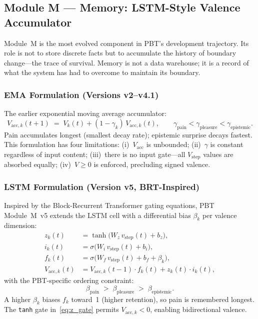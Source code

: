 \documentclass[12pt,a4paper]{article}
\begin{document}
\subsection{Module M --- Memory: LSTM-Style Valence Accumulator}

Module~M is the most evolved component in PBT's development trajectory. Its
role is not to store discrete facts but to accumulate the history of boundary
change---the trace of survival. Memory is not a data warehouse; it is a record
of what the system has had to overcome to maintain its boundary.

\subsubsection{EMA Formulation (Versions v2--v4.1)}

The earlier exponential moving average accumulator:
\begin{equation}
  V_{\mathrm{acc},k}(t{+}1) \;=\; V_k(t) + (1-\gamma_k)\,V_{\mathrm{acc},k}(t),
  \qquad \gamma_{\mathrm{pain}} < \gamma_{\mathrm{pleasure}} < \gamma_{\mathrm{epistemic}}.
  \label{eq:EMA}
\end{equation}
Pain accumulates longest (smallest decay rate); epistemic surprise decays
fastest. This formulation has four limitations: (i)~$V_{\mathrm{acc}}$ is
unbounded; (ii)~$\gamma$ is constant regardless of input content; (iii)~there
is no input gate---all $V_{\mathrm{step}}$ values are absorbed equally;
(iv)~$V\ge 0$ is enforced, precluding signed valence.

\subsubsection{LSTM Formulation (Version v5, BRT-Inspired)}

Inspired by the Block-Recurrent Transformer \citep{hutchins2022} gating
equations, PBT Module~M~v5 extends the LSTM cell with a differential bias
$\beta_k$ per valence dimension:
\begin{align}
  z_k(t)     &= \tanh\!\bigl(W_z\,v_{\mathrm{step}}(t) + b_z\bigr),
               \label{eq:z_gate}\\
  i_k(t)     &= \sigma\!\bigl(W_i\,v_{\mathrm{step}}(t) + b_i\bigr),
               \label{eq:i_gate}\\
  f_k(t)     &= \sigma\!\bigl(W_f\,v_{\mathrm{step}}(t) + b_f + \beta_k\bigr),
               \label{eq:f_gate}\\
  V_{\mathrm{acc},k}(t) &= V_{\mathrm{acc},k}(t{-}1)\cdot f_k(t)
                          + z_k(t)\cdot i_k(t),
               \label{eq:LSTM_update}
\end{align}
with the PBT-specific ordering constraint:
\begin{equation}
  \beta_{\mathrm{pain}} \;>\; \beta_{\mathrm{pleasure}} \;>\;
  \beta_{\mathrm{epistemic}}.
  \label{eq:beta_order}
\end{equation}
A higher $\beta_k$ biases $f_k$ toward~1 (higher retention), so pain is
remembered longest. The \texttt{tanh} gate in~\eqref{eq:z_gate} permits
$V_{\mathrm{acc},k}<0$, enabling bidirectional valence.
\end{document}
